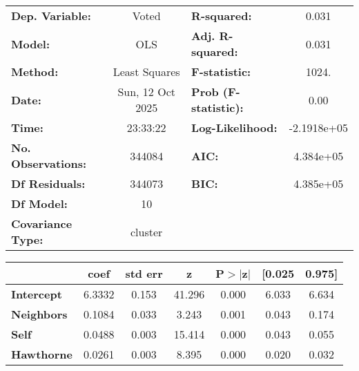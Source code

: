 \begin{center}
\begin{tabular}{lclc}
\toprule
\textbf{Dep. Variable:}                            &      Voted       & \textbf{  R-squared:         } &      0.031   \\
\textbf{Model:}                                    &       OLS        & \textbf{  Adj. R-squared:    } &      0.031   \\
\textbf{Method:}                                   &  Least Squares   & \textbf{  F-statistic:       } &      1024.   \\
\textbf{Date:}                                     & Sun, 12 Oct 2025 & \textbf{  Prob (F-statistic):} &      0.00    \\
\textbf{Time:}                                     &     23:33:22     & \textbf{  Log-Likelihood:    } & -2.1918e+05  \\
\textbf{No. Observations:}                         &      344084      & \textbf{  AIC:               } &  4.384e+05   \\
\textbf{Df Residuals:}                             &      344073      & \textbf{  BIC:               } &  4.385e+05   \\
\textbf{Df Model:}                                 &          10      & \textbf{                     } &              \\
\textbf{Covariance Type:}                          &     cluster      & \textbf{                     } &              \\
\bottomrule
\end{tabular}
\begin{tabular}{lcccccc}
                                                   & \textbf{coef} & \textbf{std err} & \textbf{z} & \textbf{P$> |$z$|$} & \textbf{[0.025} & \textbf{0.975]}  \\
\midrule
\textbf{Intercept}                                 &       6.3332  &        0.153     &    41.296  &         0.000        &        6.033    &        6.634     \\
\textbf{Neighbors}                      &       0.1084  &        0.033     &     3.243  &         0.001        &        0.043    &        0.174     \\
\textbf{Self}                           &       0.0488  &        0.003     &    15.414  &         0.000        &        0.043    &        0.055     \\
\textbf{Hawthorne}                      &       0.0261  &        0.003     &     8.395  &         0.000        &        0.020    &        0.032     \\

\end{tabular}
\end{center}
